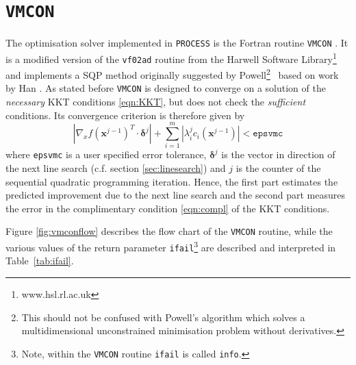 \documentclass[11pt,a4paper]{report}
\newcommand{\ifail}{\mbox{\texttt{ifail}}}
\newcommand{\process}{\mbox{\texttt{PROCESS}}}
\newcommand{\vmcon}{\mbox{\texttt{VMCON}}}
\renewcommand{\vec}[1]{\boldsymbol{#1}}
\begin{document}
\section{\vmcon}
\label{sec:vmcon}
The optimisation solver implemented in \process\/ is the Fortran routine
\vmcon\/ \cite{vmcon}. It is a modified version of the \texttt{vf02ad} routine
from the Harwell Software Library\footnote{www.hsl.rl.ac.uk} and implements a
SQP method originally suggested by Powell\footnote{This should not be confused
  with Powell's algorithm \cite{Powell1964} which solves a multidimensional
  unconstrained minimisation problem without derivatives.}~\cite{Powell1978}
based on work by Han \cite{Han1975}.  As stated before \vmcon\/ is designed to
converge on a solution of the {\it necessary} KKT conditions \ref{eqn:KKT}, but
does not check the {\it sufficient} conditions. Its convergence criterion is
therefore given by
\begin{equation}
\label{eqn:vmcon_errtol}
\left| \nabla_x f(\vec{x}^{j-1})^T \cdot \vec{\delta}^{j} \right| +
\sum^m_{i=1}\left| \lambda^j_i c_i(\vec{x}^{j-1}) \right| < \texttt{epsvmc}
\end{equation} %
where \texttt{epsvmc} is a user specified error tolerance, $\vec{\delta}^j$ is
the vector in direction of the next line search (c.f. section
\ref{sec:linesearch}) and $j$ is the counter of the sequential quadratic
programming iteration. Hence, the first part estimates the predicted
improvement due to the next line search and the second part measures the error
in the complimentary condition \ref{eqn:compl} of the KKT conditions.

Figure \ref{fig:vmconflow} describes the flow chart of the \vmcon\/ routine,
while the various values of the return parameter \ifail\/\footnote{Note,
  within the \vmcon\/ routine \ifail\/ is called \texttt{info}.} are described
and interpreted in Table~\ref{tab:ifail}.
\end{document}
